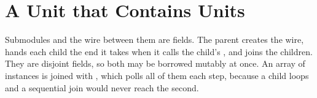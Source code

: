 \section{A Unit that Contains Units}
\label{sec:x-hierarchy}

Submodules and the wire between them are fields. The parent creates
the wire, hands each child the end it takes when it calls the child's
, and joins the children. They are disjoint fields, so both
may be borrowed mutably at once. An array of instances is joined with
, which polls all of them each step, because a child
loops and a sequential join would never reach the second.


